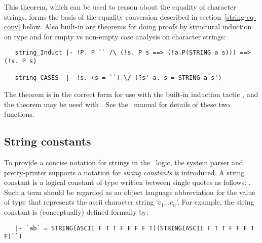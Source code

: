 \noindent This theorem, which can be used to reason about the equality of
character strings, forms the basis of the equality conversion described in
section~\ref{string-eq-conv} below.  Also
built-in are theorems for doing proofs by structural induction on type
 and  for empty vs
non-empty case analysis on character strings:

\begin{hol}
\begin{verbatim}
   string_Induct |- !P. P `` /\ (!s. P s ==> (!a.P(STRING a s))) ==> (!s. P s)

   string_CASES  |- !s. (s = ``) \/ (?s' a. s = STRING a s')
\end{verbatim}\end{hol}

\noindent The theorem  is in the correct form for use with
the built-in induction tactic , and the theorem
 may be used with .  See the \HOL\
manual for details of these two functions.


\subsection{String constants}

To provide a concise notation for strings in the \HOL\ logic, the system parser
and pretty-printer supports a notation for {\it string constants\/} is
introduced. A string constant is a logical constant of type \ml{string} written
between single quotes as follows: \ml{"`\m{c\sb{1}\ldots c\sb{n}}`"}.  Such a
term should be regarded as an object language abbreviation for the value of
type \ml{string} that represents the ascii character string `$c_1\dots c_n$'.
For example, the string constant \ml{"`ab`"} is (conceptually) defined formally
by:

\begin{hol}\begin{verbatim}
   |- `ab` = STRING(ASCII F T T F F F F T)(STRING(ASCII F T T F F F T F)``)
\end{verbatim}\end{hol}

